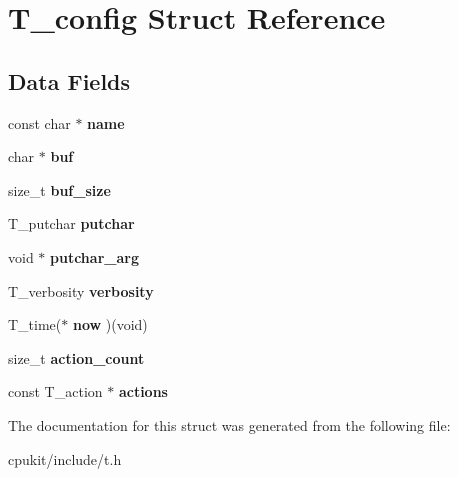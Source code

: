 \hypertarget{structT__config}{}\section{T\+\_\+config Struct Reference}
\label{structT__config}
\subsection*{Data Fields}
\begin{DoxyCompactItemize}
\item 
\mbox{\label{structT__config_a4ac3b9ef51be4dc85965c50d8f0b25fa}} 
const char $\ast$ {\bfseries name}
\item 
\mbox{\label{structT__config_ac4ab5fa359f0920b0b761182ce765c73}} 
char $\ast$ {\bfseries buf}
\item 
\mbox{\label{structT__config_abb46b413fe9cc0f94afbf270d2565538}} 
size\+\_\+t {\bfseries buf\+\_\+size}
\item 
\mbox{\label{structT__config_aef40e36caef332372e685e5767ef8176}} 
T\+\_\+putchar {\bfseries putchar}
\item 
\mbox{\label{structT__config_ab81db310e9bc94e524b4d9af7d049f12}} 
void $\ast$ {\bfseries putchar\+\_\+arg}
\item 
\mbox{\label{structT__config_a922c257ce7081a60e34d222feff5ce68}} 
T\+\_\+verbosity {\bfseries verbosity}
\item 
\mbox{\label{structT__config_a51d8030cc70d8887b48fd84fe79b74b6}} 
T\+\_\+time($\ast$ {\bfseries now} )(void)
\item 
\mbox{\label{structT__config_ada476983daef6895828ed99d5dcc5d2c}} 
size\+\_\+t {\bfseries action\+\_\+count}
\item 
\mbox{\label{structT__config_a5cef724163311322125fa8c1a18874f9}} 
const T\+\_\+action $\ast$ {\bfseries actions}
\end{DoxyCompactItemize}


The documentation for this struct was generated from the following file\+:\begin{DoxyCompactItemize}
\item 
cpukit/include/t.\+h\end{DoxyCompactItemize}
